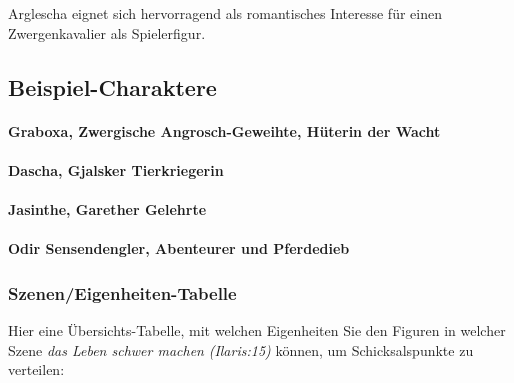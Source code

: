 Arglescha eignet sich hervorragend als romantisches Interesse für einen Zwergenkavalier als Spielerfigur.



\spaltenende
\newpage
\subsection{Beispiel-Charaktere}
\paragraph{Graboxa, Zwergische Angrosch-Geweihte, Hüterin der Wacht}
\paragraph{Dascha, Gjalsker Tierkriegerin}
\paragraph{Jasinthe, Garether Gelehrte}
\paragraph{Odir Sensendengler, Abenteurer und Pferdedieb}
\subsubsection{Szenen/Eigenheiten-Tabelle}
Hier eine Übersichts-Tabelle, mit welchen Eigenheiten Sie den Figuren in welcher Szene \emph{das Leben schwer machen} \emph{(Ilaris:15)} können, um Schicksalspunkte zu verteilen:

